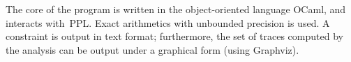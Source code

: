 \documentclass{llncs}
\newcommand{\graphviz}{Graphviz}
\newcommand{\hymitator}{\textsc{Hymitator}}
\begin{document}
The core of the program is written in the object-oriented language OCaml, and interacts with~PPL.
Exact arithmetics with unbounded precision is used.
A constraint is output in text format; furthermore, the set of traces computed by the analysis can be output under a graphical form (using \graphviz{}).

% 	
% 
% 	
% 
% 
% 
% 
% 	
% 	
% 	
% 	
% 	
% 
% 
% 
% 
\end{document}
